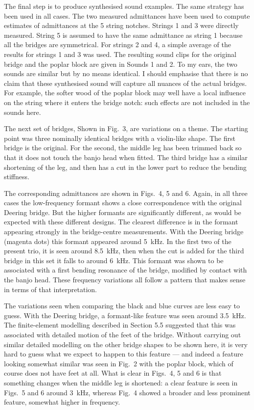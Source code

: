   The final step is to produce synthesised sound examples. The same strategy 
  has been used in all cases. The two measured admittances have been used to 
  compute estimates of admittances at the 5 string notches. Strings 1 and 3 
  were directly measured. String 5 is assumed to have the same admittance as 
  string 1 because all the bridges are symmetrical. For strings 2 and 4, a 
  simple average of the results for strings 1 and 3 was used. The resulting 
  sound clips for the original bridge and the poplar block are given in Sounds 
  1 and 2. To my ears, the two sounds are similar but by no means identical. I 
  should emphasise that there is no claim that these synthesised sound will 
  capture all nuances of the actual bridges. For example, the softer wood of 
  the poplar block may well have a local influence on the string where it 
  enters the bridge notch: such effects are not included in the sounds here. 

  The next set of bridges, Shown in Fig.\ 3, are variations on a theme. The 
  starting point was three nominally identical bridges with a violin-like 
  shape. The first bridge is the original. For the second, the middle leg has 
  been trimmed back so that it does not touch the banjo head when fitted. The 
  third bridge has a similar shortening of the leg, and then has a cut in the 
  lower part to reduce the bending stiffness. 

  The corresponding admittances are shown in Figs.\ 4, 5 and 6. Again, in all 
  three cases the low-frequency formant shows a close correspondence with the 
  original Deering bridge. But the higher formants are significantly different, 
  as would be expected with these different designs. The clearest difference is 
  in the formant appearing strongly in the bridge-centre measurements. With the 
  Deering bridge (magenta dots) this formant appeared around 5~kHz. In the 
  first two of the present trio, it is seen around 8.5~kHz, then when the cut 
  is added for the third bridge in this set it falls to around 6~kHz. This 
  formant was shown to be associated with a first bending resonance of the 
  bridge, modified by contact with the banjo head. These frequency variations 
  all follow a pattern that makes sense in terms of that interpretation. 

  The variations seen when comparing the black and blue curves are less easy to 
  guess. With the Deering bridge, a formant-like feature was seen around 
  3.5~kHz. The finite-element modelling described in Section 5.5 suggested that 
  this was associated with detailed motion of the feet of the bridge. Without 
  carrying out similar detailed modelling on the other bridge shapes to be 
  shown here, it is very hard to guess what we expect to happen to this feature 
  --- and indeed a feature looking somewhat similar was seen in Fig.\ 2 with 
  the poplar block, which of course does not have feet at all. What is clear in 
  Figs.\ 4, 5 and 6 is that something changes when the middle leg is shortened: 
  a clear feature is seen in Figs.\ 5 and 6 around 3~kHz, whereas Fig.\ 4 
  showed a broader and less prominent feature, somewhat higher in frequency. 

